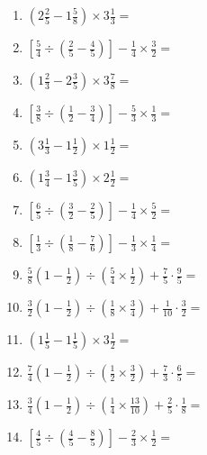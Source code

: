 \documentclass[12pt]{article}
\begin{document}
\begin{enumerate}[ itemsep=1.5cm]
	\item $\displaystyle \left( 2 \frac{2}{5} - 1 \frac{5}{8} \right) \times 3 \frac{1}{3} =$
	\item $\displaystyle \left[ \frac{5}{4} \div \left( \frac{2}{5} - \frac{4}{5} \right) \right] - \frac{1}{4} \times \frac{3}{2} =$
	\item $\displaystyle \left( 1 \frac{2}{3} - 2 \frac{3}{5} \right) \times 3 \frac{7}{8} =$
	\item $\displaystyle \left[ \frac{3}{8} \div \left( \frac{1}{2} - \frac{3}{4} \right) \right] - \frac{5}{3} \times \frac{1}{3} =$
	\item $\displaystyle \left( 3 \frac{1}{3} - 1 \frac{1}{2} \right) \times 1 \frac{1}{2} =$
	\item $\displaystyle \left( 1 \frac{3}{4} - 1 \frac{3}{5} \right) \times 2 \frac{1}{2} =$
	\item $\displaystyle \left[ \frac{6}{5} \div \left( \frac{3}{2} - \frac{2}{5} \right) \right] - \frac{1}{4} \times \frac{5}{2} =$
	\item $\displaystyle \left[ \frac{1}{3} \div \left( \frac{1}{8} - \frac{7}{6} \right) \right] - \frac{1}{3} \times \frac{1}{4} =$
	\item $\displaystyle \frac{5}{8} \left( 1 - \frac{1}{2} \right) \div \left( \frac{5}{4} \times \frac{1}{2} \right) + \frac{7}{5} \cdot \frac{9}{5} =$

	\item $\displaystyle \frac{3}{2} \left( 1 - \frac{1}{2} \right) \div \left( \frac{1}{8} \times \frac{3}{4} \right) + \frac{1}{10} \cdot \frac{3}{2} =$
	\item $\displaystyle \left( 1 \frac{1}{5} - 1 \frac{1}{5} \right) \times 3 \frac{1}{2} =$
	\item $\displaystyle \frac{7}{4} \left( 1 - \frac{1}{2} \right) \div \left( \frac{1}{2} \times \frac{3}{2} \right) + \frac{7}{3} \cdot \frac{6}{5} =$
	\item $\displaystyle \frac{3}{4} \left( 1 - \frac{1}{2} \right) \div \left( \frac{1}{4} \times \frac{13}{10} \right) + \frac{2}{5} \cdot \frac{1}{8} =$
	\item $\displaystyle \left[ \frac{4}{5} \div \left( \frac{4}{5} - \frac{8}{5} \right) \right] - \frac{2}{3} \times \frac{1}{2} =$
\end{enumerate}
\end{document}
